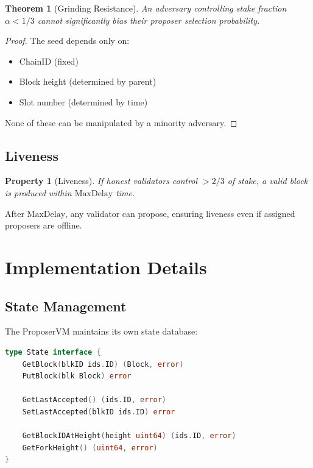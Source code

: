 \documentclass[11pt,letterpaper]{article}
\newtheorem{theorem}{Theorem}
\newtheorem{property}{Property}
\begin{document}
\begin{theorem}[Grinding Resistance]
An adversary controlling stake fraction $\alpha < 1/3$ cannot significantly bias their proposer selection probability.
\end{theorem}

\begin{proof}
The seed depends only on:
\begin{itemize}
    \item ChainID (fixed)
    \item Block height (determined by parent)
    \item Slot number (determined by time)
\end{itemize}
None of these can be manipulated by a minority adversary.
\end{proof}

\subsection{Liveness}

\begin{property}[Liveness]
If honest validators control $> 2/3$ of stake, a valid block is produced within $\text{MaxDelay}$ time.
\end{property}

After $\text{MaxDelay}$, any validator can propose, ensuring liveness even if assigned proposers are offline.

\section{Implementation Details}

\subsection{State Management}

The ProposerVM maintains its own state database:

\begin{lstlisting}[language=Go, caption=State Interface]
type State interface {
    GetBlock(blkID ids.ID) (Block, error)
    PutBlock(blk Block) error

    GetLastAccepted() (ids.ID, error)
    SetLastAccepted(blkID ids.ID) error

    GetBlockIDAtHeight(height uint64) (ids.ID, error)
    GetForkHeight() (uint64, error)
}
\end{lstlisting}
\end{document}
